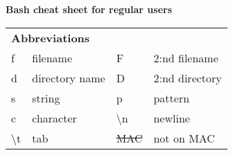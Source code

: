 \documentclass[a4paper,10pt,landscape]{report}
\newcommand{\boxtitle}[1]{{\textbf{\color{RubineRed}#1}}}
\newcommand{\rabbr}[1]{{\color{Red}#1}}
\begin{document}
\begin{center}
{\huge{\textbf{Bash cheat sheet for regular users}}}
\end{center}

\begin{multicols}{4}

\begin{mdframed}[style=mybox2]
\begin{tabular}{ l l l l }
\multicolumn{4}{l}{\boxtitle{Abbreviations}} \\
\rabbr{f}                    & filename         & \rabbr{F}      & 2:nd filename \\
\rabbr{d}                    & directory name   & \rabbr{D}      & 2:nd directory \\
\rabbr{s}                    & string           & \rabbr{p}      & pattern \\
\rabbr{c}                    & character        & \rabbr{\textbackslash{}n}    & newline \\
\rabbr{\textbackslash{}t}    & tab              & \rabbr{\sout{MAC}}           & not on MAC \\
\end{tabular}
\end{mdframed}


\end{multicols}
\end{document}
